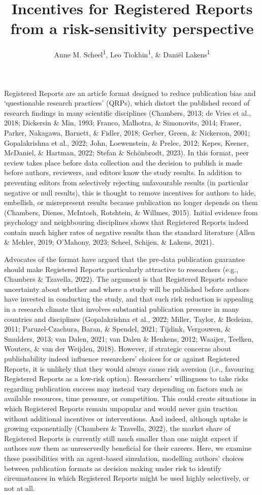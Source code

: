 \documentclass[
  british,
  a4paper,
  ,man,mask,floatsintext]{apa6}
\title{Incentives for Registered Reports from a risk-sensitivity perspective}
\author{Anne M. Scheel\textsuperscript{1}, Leo Tiokhin\textsuperscript{1}, \& Daniël Lakens\textsuperscript{1}}
\date{}
\affiliation{\vspace{0.5cm}\textsuperscript{1} Eindhoven University of Technology}
\begin{document}
\maketitle

Registered Reports are an article format designed to reduce publication bias and `questionable research practices' (QRPs), which distort the published record of research findings in many scientific disciplines (Chambers, 2013; de Vries et al., 2018; Dickersin \& Min, 1993; Franco, Malhotra, \& Simonovits, 2014; Fraser, Parker, Nakagawa, Barnett, \& Fidler, 2018; Gerber, Green, \& Nickerson, 2001; Gopalakrishna et al., 2022; John, Loewenstein, \& Prelec, 2012; Kepes, Keener, McDaniel, \& Hartman, 2022; Stefan \& Schönbrodt, 2023).
In this format, peer review takes place before data collection and the decision to publish is made before authors, reviewers, and editors know the study results.
In addition to preventing editors from selectively rejecting unfavourable results (in particular negative or null results), this is thought to remove incentives for authors to hide, embellish, or misrepresent results because publication no longer depends on them
(Chambers, Dienes, McIntosh, Rotshtein, \& Willmes, 2015).
Initial evidence from psychology and neighbouring disciplines shows that Registered Reports indeed contain much higher rates of negative results than the standard literature (Allen \& Mehler, 2019; O'Mahony, 2023; Scheel, Schijen, \& Lakens, 2021).

Advocates of the format have argued that the pre-data publication guarantee should make Registered Reports particularly attractive to researchers (e.g., Chambers \& Tzavella, 2022).
The argument is that Registered Reports reduce uncertainty about whether and where a study will be published before authors have invested in conducting the study, and that such risk reduction is appealing
in a research climate that involves substantial publication pressure in many countries and disciplines (Gopalakrishna et al., 2022; Miller, Taylor, \& Bedeian, 2011; Paruzel-Czachura, Baran, \& Spendel, 2021; Tijdink, Vergouwen, \& Smulders, 2013; van Dalen, 2021; van Dalen \& Henkens, 2012; Waaijer, Teelken, Wouters, \& van der Weijden, 2018).
However, if strategic concerns about publishability indeed influence researchers' choices for or against Registered Reports, it is unlikely that they would always cause risk aversion (i.e., favouring Registered Reports as a low-risk option).
Researchers' willingness to take risks regarding publication success may instead vary depending on factors such as available resources, time pressure, or competition.
This could create situations in which Registered Reports remain unpopular and would never gain traction without additional incentives or interventions.
And indeed, although uptake is growing exponentially (Chambers \& Tzavella, 2022), the market share of Registered Reports is currently still much smaller than one might expect if authors saw them as unreservedly beneficial for their careers.
Here, we examine these possibilities with an agent-based simulation, modelling authors' choices between publication formats as decision making under risk to identify circumstances in which Registered Reports might be used highly selectively, or not at all.
\end{document}
